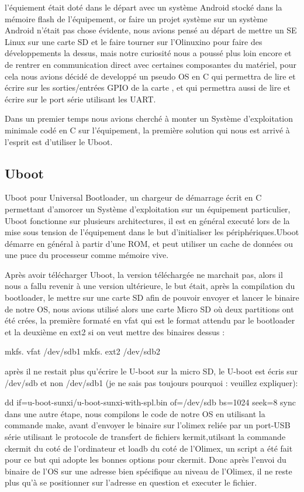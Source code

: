 \documentclass[frenchb]{article}
\begin{document}
 l'équiement était doté dans le départ avec un système Android stocké dans la mémoire flash de l'équipement, 
 or faire un projet système sur un système Android n'était pas chose évidente, nous avions pensé au départ de mettre 
 un SE Linux sur une carte SD et le faire tourner sur l'Olinuxino pour faire des développements la dessus, 
 mais notre curiosité nous a poussé plus loin encore et de rentrer en communication direct avec certaines composantes 
 du matériel, pour cela nous avions décidé de developpé un pseudo OS en C qui permettra de lire et écrire sur les 
 sorties/entrées GPIO de la carte , et qui permettra aussi de lire et écrire sur le port série utilisant les UART.

	Dans un premier temps nous avions cherché à monter un Système d'exploitation minimale codé en C sur l'équipement, 
 la première solution qui nous est arrivé à l'esprit est d'utiliser le Uboot.

\subsection{Uboot}

Uboot pour Universal Bootloader,  un chargeur de démarrage écrit en C permettant d'amorcer un Système d'exploitation 
sur un équipement particulier, Uboot fonctionne sur plusieurs architectures, il est en général executé lors de la mise 
sous tension de l'équipement dans le but d'initialiser les périphériques.Uboot démarre en général à partir d'une ROM, 
et peut utiliser un cache de données ou  une puce du processeur comme mémoire vive.

  Après avoir télécharger Uboot, la version téléchargée ne marchait pas, alors il nous a fallu revenir à une version 
ultérieure, le but était, après la compilation du bootloader, le mettre sur une carte SD afin de pouvoir envoyer et 
lancer le binaire de notre OS,  nous avions utilisé alors une carte Micro SD  où  deux partitions ont été crées, 
la première formaté en vfat qui est le format attendu par le bootloader  et la deuxième en ext2 si on veut mettre 
des binaires dessus :

	mkfs. vfat  /dev/sdb1
	mkfs. ext2 /dev/sdb2
 
 après il ne restait plus qu'écrire le U-boot sur la micro SD, le U-boot est écris sur /dev/sdb et non /dev/sdb1 
(je ne sais pas toujours pourquoi : veuillez expliquer):

    dd if=u-boot-sunxi/u-boot-sunxi-with-spl.bin of=/dev/sdb bs=1024 seek=8 sync
  dans une autre étape, nous compilons le code de notre OS en utilisant la commande make, avant d'envoyer le binaire 
sur l'olimex reliée par un port-USB série utilisant le protocole de transfert de fichiers kermit,utilsant la commande 
ckermit du coté de l'ordinateur et loadb du coté de l'Olimex, un script a été fait pour ce but qui adopte les bonnes 
options pour ckermit.
Donc après l'envoi du binaire de l'OS sur une adresse bien spécifique au niveau de l'Olimex, il ne reste plus qu'à se 
positionner sur l'adresse en question et executer le fichier.
\end{document}
